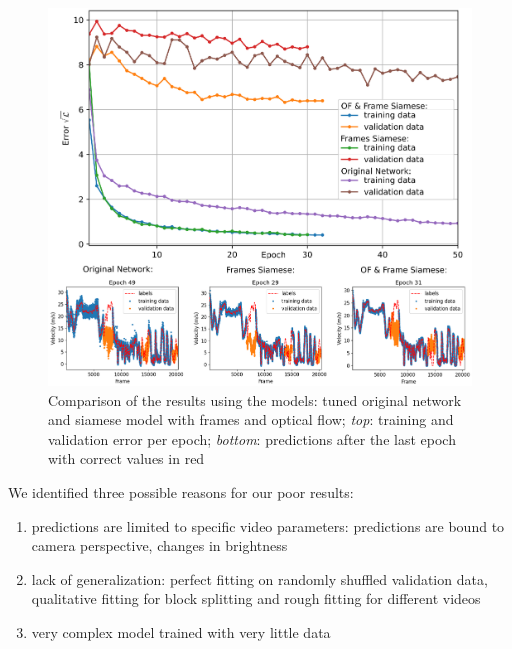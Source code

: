 \documentclass[conference]{IEEEtran}
\begin{document}
\begin{figure}[ht]
	\centering
	\includegraphics[width=0.99\columnwidth]{imgs/TrainingProcess.eps}
	\caption{Comparison of the results using the models: tuned original network and siamese model with frames and optical flow; \textit{top}: training and validation error per epoch; 
	\emph{bottom}: predictions after the last epoch with correct values in red}
	\label{fig:resultsSummary}
\end{figure}

We identified three possible reasons for our poor results:
\begin{enumerate}[label=(\roman*)]
	\item predictions are limited to specific video parameters: predictions are bound to camera perspective, changes in brightness
	\item lack of generalization: perfect fitting on randomly shuffled validation data, qualitative fitting for block splitting and rough fitting for different videos
	\item very complex model trained with very little data
\end{enumerate}
\end{document}
